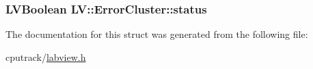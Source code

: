 \subsubsection[{\texorpdfstring{status}{status}}]{\setlength{\rightskip}{0pt plus 5cm}L\+V\+Boolean L\+V\+::\+Error\+Cluster\+::status}\hypertarget{struct_l_v_1_1_error_cluster_a5afa01e7222b9c669a1c2bbe03ebe6ee}{}\label{struct_l_v_1_1_error_cluster_a5afa01e7222b9c669a1c2bbe03ebe6ee}


The documentation for this struct was generated from the following file\+:\begin{DoxyCompactItemize}
\item 
cputrack/\hyperlink{labview_8h}{labview.\+h}\end{DoxyCompactItemize}
